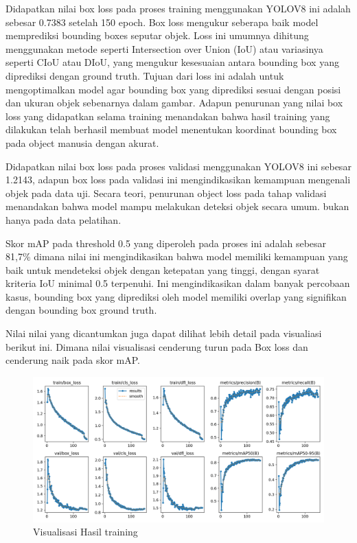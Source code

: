 Didapatkan nilai box loss pada proses training menggunakan YOLOV8 ini adalah sebesar 0.7383 setelah 150 epoch. Box loss mengukur seberapa baik model memprediksi bounding boxes seputar objek. Loss ini umumnya dihitung menggunakan metode seperti Intersection over Union (IoU) atau variasinya seperti CIoU atau DIoU, yang mengukur kesesuaian antara bounding box yang diprediksi dengan ground truth. Tujuan dari loss ini adalah untuk mengoptimalkan model agar bounding box yang diprediksi sesuai dengan posisi dan ukuran objek sebenarnya dalam gambar. Adapun penurunan yang nilai box loss yang didapatkan selama training menandakan bahwa hasil training yang dilakukan telah berhasil membuat model menentukan koordinat bounding box pada object manusia dengan akurat.

Didapatkan nilai box loss pada proses validasi menggunakan YOLOV8 ini sebesar 1.2143, adapun box loss pada validasi ini mengindikasikan kemampuan mengenali objek pada data uji. Secara teori, penurunan object loss pada tahap validasi menandakan bahwa model mampu melakukan deteksi objek secara umum. bukan hanya pada data pelatihan.

Skor mAP pada threshold 0.5 yang diperoleh pada proses ini adalah sebesar 81,7\% dimana nilai ini mengindikasikan bahwa model memiliki kemampuan yang baik untuk mendeteksi objek dengan ketepatan yang tinggi, dengan syarat kriteria IoU minimal 0.5 terpenuhi. Ini mengindikasikan dalam banyak percobaan kasus, bounding box yang diprediksi oleh model memiliki overlap yang signifikan dengan bounding box ground truth.

Nilai nilai yang dicantumkan juga dapat dilihat lebih detail pada visualiasi berikut ini. Dimana nilai visualisasi cenderung turun pada Box loss dan cenderung naik pada skor mAP. 

\begin{figure}[H]
    \centering
    \includegraphics[scale=0.4]{gambar/loss 150 epoch.png}
    \caption{Visualisasi Hasil training}
    \label{fig:visualisasi hasil training}
\end{figure}


